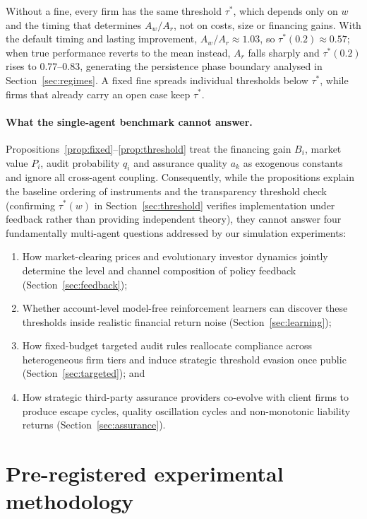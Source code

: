 \documentclass[11pt]{article}
\begin{document}
Without a fine, every firm has the same threshold $\tau^*$, which depends only on $w$ and the timing that determines $A_w/A_r$, not on costs, size or financing gains. With the default timing and lasting improvement, $A_w/A_r \approx 1.03$, so $\tau^*(0.2) \approx 0.57$; when true performance reverts to the mean instead, $A_r$ falls sharply and $\tau^*(0.2)$ rises to $0.77$--$0.83$, generating the persistence phase boundary analysed in Section~\ref{sec:regimes}. A fixed fine spreads individual thresholds below $\tau^*$, while firms that already carry an open case keep $\tau^*$.

\paragraph{What the single-agent benchmark cannot answer.}
Propositions~\ref{prop:fixed}--\ref{prop:threshold} treat the financing gain $B_i$, market value $P_i$, audit probability $q_i$ and assurance quality $a_k$ as exogenous constants and ignore all cross-agent coupling. Consequently, while the propositions explain the baseline ordering of instruments and the transparency threshold check (confirming $\tau^*(w)$ in Section~\ref{sec:threshold} verifies implementation under feedback rather than providing independent theory), they cannot answer four fundamentally multi-agent questions addressed by our simulation experiments:
\begin{enumerate}[leftmargin=*]
\item How market-clearing prices and evolutionary investor dynamics jointly determine the level and channel composition of policy feedback (Section~\ref{sec:feedback});
\item Whether account-level model-free reinforcement learners can discover these thresholds inside realistic financial return noise (Section~\ref{sec:learning});
\item How fixed-budget targeted audit rules reallocate compliance across heterogeneous firm tiers and induce strategic threshold evasion once public (Section~\ref{sec:targeted}); and
\item How strategic third-party assurance providers co-evolve with client firms to produce escape cycles, quality oscillation cycles and non-monotonic liability returns (Section~\ref{sec:assurance}).
\end{enumerate}

\section{Pre-registered experimental methodology}\label{sec:design}
\end{document}
